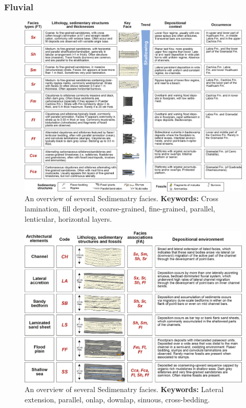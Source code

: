 \subsubsection{Fluvial}
\begin{figure}[h!]
    \centering
    \includegraphics[width=0.75\linewidth]{Figures/0.4Field/Alvan2018_trace_field_1.png}
    \caption[An overview of several Sedimenatry facies]{An overview of several Sedimenatry facies\citep{Alvan2018}. \textbf{Keywords:} Cross lamination, fill deposit, coarse-grained, fine-grained, parallel, lenticular, horizontal layers.}
    \label{fig:Alvan2018-1}
\end{figure}

\begin{figure}[h!]
    \centering
    \includegraphics[width=0.75\linewidth]{Figures/0.4Field/Alvan2018_trace_field_2.png}
    \caption[An overview of several Sedimenatry facies]{An overview of several Sedimenatry facies\citep{Alvan2018}. \textbf{Keywords:} Lateral extension, parallel, onlap, downlap, sinuous, cross-bedding.}
    \label{fig:Alvan2018-2}
\end{figure}

